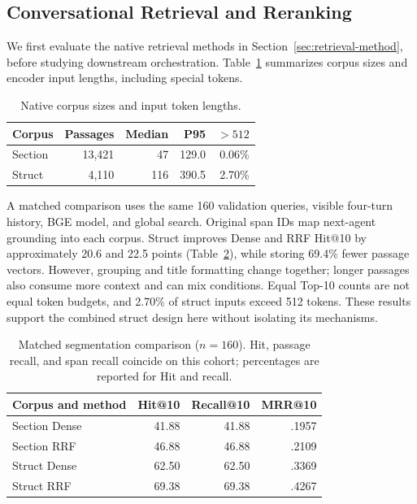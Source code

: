 \subsection{Conversational Retrieval and Reranking}
\label{sec:retrieval-study}
We first evaluate the native retrieval methods in Section~\ref{sec:retrieval-method}, before studying downstream orchestration. Table~\ref{tab:segmentation} summarizes corpus sizes and encoder input lengths, including special tokens.

\begin{table}[t]
\centering\small
\setlength{\tabcolsep}{3.5pt}
\begin{tabular}{lrrrr}
\toprule
Corpus & Passages & Median & P95 & $>512$\\
\midrule
Section & 13,421 & 47 & 129.0 & 0.06\%\\
Struct & 4,110 & 116 & 390.5 & 2.70\%\\
\bottomrule
\end{tabular}
\caption{Native corpus sizes and input token lengths.}
\label{tab:segmentation}
\end{table}

A matched comparison uses the same 160 validation queries, visible four-turn history, BGE model, and global search. Original span IDs map next-agent grounding into each corpus. Struct improves Dense and RRF Hit@10 by approximately 20.6 and 22.5 points (Table~\ref{tab:segment-results}), while storing 69.4\% fewer passage vectors. However, grouping and title formatting change together; longer passages also consume more context and can mix conditions. Equal Top-10 counts are not equal token budgets, and 2.70\% of struct inputs exceed 512 tokens. These results support the combined struct design here without isolating its mechanisms.

\begin{table}[t]
\centering\small
\setlength{\tabcolsep}{4pt}
\begin{tabular}{lrrr}
\toprule
Corpus and method & Hit@10 & Recall@10 & MRR@10\\
\midrule
Section Dense & 41.88 & 41.88 & .1957\\
Section RRF & 46.88 & 46.88 & .2109\\
Struct Dense & 62.50 & 62.50 & .3369\\
Struct RRF & 69.38 & 69.38 & .4267\\
\bottomrule
\end{tabular}
\caption{Matched segmentation comparison ($n=160$). Hit, passage recall, and span recall coincide on this cohort; percentages are reported for Hit and recall.}
\label{tab:segment-results}
\end{table}

